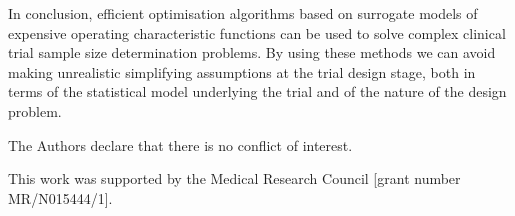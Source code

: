 \documentclass[sagev, Crown]{sagej}
\begin{document}
In conclusion, efficient optimisation algorithms based on surrogate models of expensive operating characteristic functions can be used to solve complex clinical trial sample size determination problems. By using these methods we can avoid making unrealistic simplifying assumptions at the trial design stage, both in terms of the statistical model underlying the trial and of the nature of the design problem.

\begin{dci}
The Authors declare that there is no conflict of interest.
\end{dci}

\begin{funding}
This work was supported by the Medical Research Council [grant number MR/N015444/1].
\end{funding}



\end{document}
